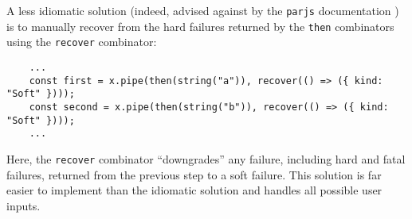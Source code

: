 A less idiomatic solution (indeed, advised against by the \lstinline{parjs} documentation \cite{parjs}) is to manually recover from the hard failures returned by the \lstinline{then} combinators using the \lstinline{recover} combinator:
\begin{lstlisting}
    ...
    const first = x.pipe(then(string("a")), recover(() => ({ kind: "Soft" })));
    const second = x.pipe(then(string("b")), recover(() => ({ kind: "Soft" })));
    ...
\end{lstlisting}
Here, the \lstinline{recover} combinator ``downgrades'' any failure, including hard and fatal failures, returned from the previous step to a soft failure. This solution is far easier to implement than the idiomatic solution and handles all possible user inputs.
